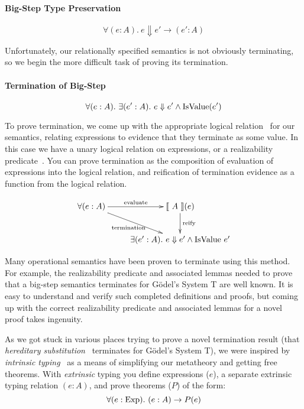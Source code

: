 \documentclass[preprint,nonatbib]{sigplanconf}
\numberwithin{subdefin}{defin}
\numberwithin{subtheorem}{theorem}
\def\bigstep{\Downarrow}
\def\marr{\rightarrow}
\newcommand{\ascribe}[2]{(#1 : #2)}
\newcommand{\all}[1]{\forall#1.~}
\newcommand{\ex}[1]{\exists#1.~}
\newcommand{\el}[1]{\llbracket ~ #1 ~ \rrbracket}
\newcommand{\con}[1]{\textmd{#1}}
\newcommand{\fun}[1]{\textmd{#1}}
\begin{document}
\paragraph{Big-Step Type Preservation}

$$
\all{\ascribe{e}{A}} e \bigstep e' \marr \ascribe{e'}{A}
$$



Unfortunately, our relationally specified semantics is not obviously
terminating, so we begin the more difficult task of proving its
termination.

\paragraph{Termination of Big-Step}

$$
\all{\ascribe{e}{A}} \ex{\ascribe{e'}{A}} e \bigstep e' \land \fun{IsValue}(e')
$$

To prove termination, we come up with the appropriate logical
relation~\cite{TODO} for our semantics, relating expressions to evidence
that they terminate as some value.
In this case we have a unary
logical relation on expressions, or a realizability
predicate~\cite{TODO}. You can prove termination as the composition of
evaluation of expressions into the logical relation, and reification
of termination evidence as a function from the logical relation.

\begin{displaymath}
    \xymatrix{
          {\forall (e : A)} 
          \ar[dr]_{\fun{termination}}
          \ar[r]^{\fun{evaluate}}
        & {\el{A}(e)}
          \ar[d]^{\large{\fun{reify}}}
\\      & {\exists (e' : A). ~ e \bigstep e' \wedge \fun{IsValue} ~ e'} }
\end{displaymath}

Many operational semantics have been proven to terminate using this
method. For example, the realizability predicate and associated lemmas
needed to prove that a big-step semantics terminates for G{\"o}del's
System T are well known. It is easy to understand and verify such
completed definitions and proofs, but coming up with the correct
realizability predicate and associated lemmas for a novel proof takes
ingenuity. 

As we got stuck in various places trying to prove a novel termination result
(that {\it hereditary substitution}~\cite{TODO} terminates for
G{\"o}del's System T), we were inspired by
{\it intrinsic typing}~\cite{TODO} as a means of simplifying our
metatheory and getting free theorems. With {\it extrinsic} typing you
define expressions ($e$), a separate extrinsic typing relation $\ascribe{e}{A}$, and prove
theorems ($P$) of the form:
$$
\all{\ascribe{e}{\con{Exp}}} \ascribe{e}{A} \marr P(e) $$
\end{document}
